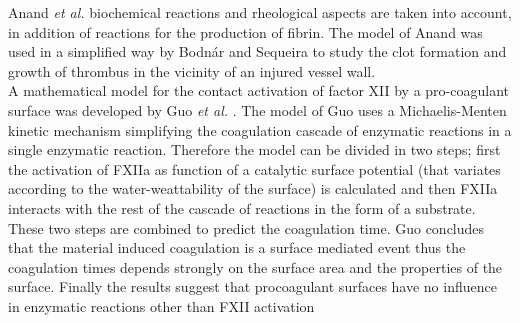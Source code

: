 \documentclass[%
 nofootinbib,
 amsmath,amssymb,
 aps,
 pra,
]{revtex4-1}
\begin{document}
Anand \textit{et al.} \citep{Anand:2003, Anand:2006, Anand:2008} biochemical reactions and rheological aspects are taken into account, in addition of reactions for the production of fibrin. The model of Anand \citep{Anand:2003} was used in a simplified way by Bodn\'{a}r and Sequeira \citep{Bodnar:2008} to study the clot formation and growth of thrombus in the vicinity of an injured vessel wall.\\
A mathematical model for the contact activation of factor XII by a pro-coagulant surface was developed by Guo \textit{et al.} \citep{Guo:2006}. The model of Guo uses a Michaelis-Menten kinetic mechanism simplifying the coagulation cascade of enzymatic reactions in a single enzymatic reaction. Therefore the model can be divided in two steps; first the activation of FXIIa as function of a catalytic surface potential (that variates according to the water-weattability of the surface) is calculated and then FXIIa interacts with the rest of the cascade of reactions in the form of a substrate. These two steps are combined to predict the coagulation time. Guo concludes that the material induced coagulation is a surface mediated event thus the coagulation times depends strongly on the surface area and the properties of the surface. Finally the results suggest that procoagulant surfaces have no influence in enzymatic reactions other than FXII activation
\end{document}
